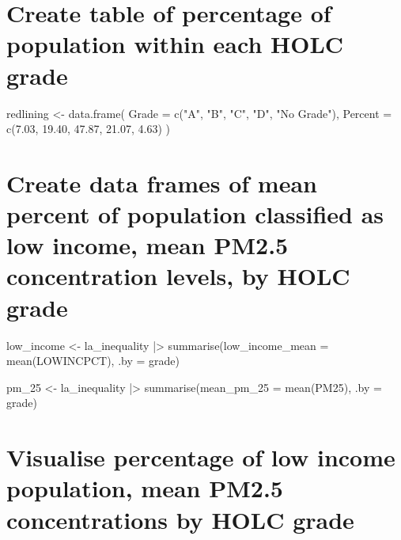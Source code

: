 \documentclass[
  letterpaper,
  DIV=11,
  numbers=noendperiod]{scrartcl}
\newenvironment{Shaded}{\begin{snugshade}}{\end{snugshade}}
\newcommand{\AttributeTok}[1]{\textcolor[rgb]{0.40,0.45,0.13}{#1}}
\newcommand{\FloatTok}[1]{\textcolor[rgb]{0.68,0.00,0.00}{#1}}
\newcommand{\FunctionTok}[1]{\textcolor[rgb]{0.28,0.35,0.67}{#1}}
\newcommand{\NormalTok}[1]{\textcolor[rgb]{0.00,0.23,0.31}{#1}}
\newcommand{\OtherTok}[1]{\textcolor[rgb]{0.00,0.23,0.31}{#1}}
\newcommand{\SpecialCharTok}[1]{\textcolor[rgb]{0.37,0.37,0.37}{#1}}
\newcommand{\StringTok}[1]{\textcolor[rgb]{0.13,0.47,0.30}{#1}}
\begin{document}
\section{Create table of percentage of population within each HOLC
grade}\label{create-table-of-percentage-of-population-within-each-holc-grade}

\begin{Shaded}
\begin{Highlighting}[]
\NormalTok{redlining }\OtherTok{\textless{}{-}} \FunctionTok{data.frame}\NormalTok{(}
  \AttributeTok{Grade =} \FunctionTok{c}\NormalTok{(}\StringTok{"A"}\NormalTok{, }\StringTok{"B"}\NormalTok{, }\StringTok{"C"}\NormalTok{, }\StringTok{"D"}\NormalTok{, }\StringTok{"No Grade"}\NormalTok{),}
  \AttributeTok{Percent =} \FunctionTok{c}\NormalTok{(}\FloatTok{7.03}\NormalTok{, }\FloatTok{19.40}\NormalTok{, }\FloatTok{47.87}\NormalTok{, }\FloatTok{21.07}\NormalTok{, }\FloatTok{4.63}\NormalTok{)}
\NormalTok{)}
\end{Highlighting}
\end{Shaded}

\section{Create data frames of mean percent of population classified as
low income, mean PM2.5 concentration levels, by HOLC
grade}\label{create-data-frames-of-mean-percent-of-population-classified-as-low-income-mean-pm2.5-concentration-levels-by-holc-grade}

\begin{Shaded}
\begin{Highlighting}[]
\NormalTok{low\_income }\OtherTok{\textless{}{-}}\NormalTok{ la\_inequality }\SpecialCharTok{|\textgreater{}} 
  \FunctionTok{summarise}\NormalTok{(}\AttributeTok{low\_income\_mean =} \FunctionTok{mean}\NormalTok{(LOWINCPCT), }\AttributeTok{.by =} \StringTok{\textquotesingle{}grade\textquotesingle{}}\NormalTok{)}

\NormalTok{pm\_25 }\OtherTok{\textless{}{-}}\NormalTok{ la\_inequality }\SpecialCharTok{|\textgreater{}} 
  \FunctionTok{summarise}\NormalTok{(}\AttributeTok{mean\_pm\_25 =} \FunctionTok{mean}\NormalTok{(PM25), }\AttributeTok{.by =} \StringTok{\textquotesingle{}grade\textquotesingle{}}\NormalTok{)}
\end{Highlighting}
\end{Shaded}

\section{Visualise percentage of low income population, mean PM2.5
concentrations by HOLC
grade}\label{visualise-percentage-of-low-income-population-mean-pm2.5-concentrations-by-holc-grade}
\end{document}
